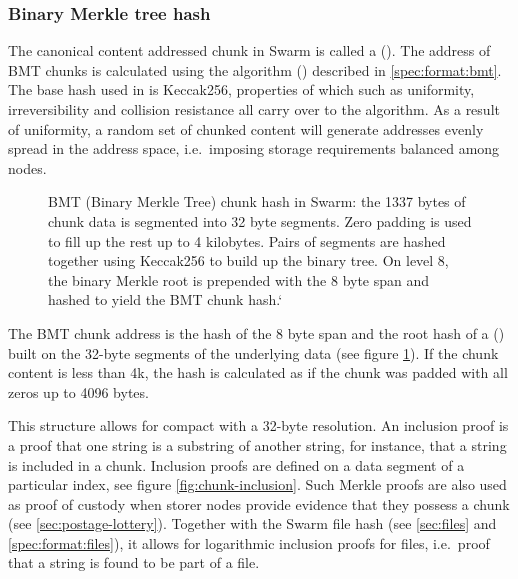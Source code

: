 \subsubsection{Binary Merkle tree hash}

The canonical content addressed chunk in Swarm is called a  ().
The address of BMT chunks is calculated using the  algorithm () described in \ref{spec:format:bmt}. The base hash used in  is Keccak256, properties of which such as uniformity, irreversibility and collision resistance all carry over to the  algorithm. As a result of uniformity, a random set of chunked content will generate addresses evenly spread in the address space, i.e.\ imposing storage requirements balanced among nodes.


\begin{figure}[htbp]
   \centering
   \resizebox{1\textwidth}{!}{
   }
   \caption[BMT: Binary Merkle Tree hash used as chunk hash in Swarm \statusgreen]{BMT (Binary Merkle Tree) chunk hash in Swarm: the 1337 bytes of chunk data is segmented into 32 byte segments. Zero padding is used to fill up the rest up to 4 kilobytes. Pairs of segments are hashed together using Keccak256 to build up the binary tree. On level 8, the binary Merkle root is prepended with the 8 byte span and hashed to yield the BMT chunk hash.`}
   \label{fig:BMT}
\end{figure}

The BMT chunk address is the hash of the 8 byte span and the root hash of a  () built on the 32-byte segments of the underlying data (see figure \ref{fig:BMT}). If the chunk content is less than 4k, the hash is calculated as if the chunk was padded with all zeros up to 4096 bytes.

This structure allows for compact  with a 32-byte resolution. An inclusion proof is a proof that one string is a substring of another string, for instance, that a string is included in a chunk. Inclusion proofs are defined on a data segment of a particular index, see figure \ref{fig:chunk-inclusion}. Such Merkle proofs are also used as proof of custody when storer nodes provide evidence that they possess a chunk (see \ref{sec:postage-lottery}). Together with the Swarm file hash (see \ref{sec:files} and \ref{spec:format:files}), it allows for logarithmic inclusion proofs for files, i.e.\ proof that a string is found to be part of a file.


